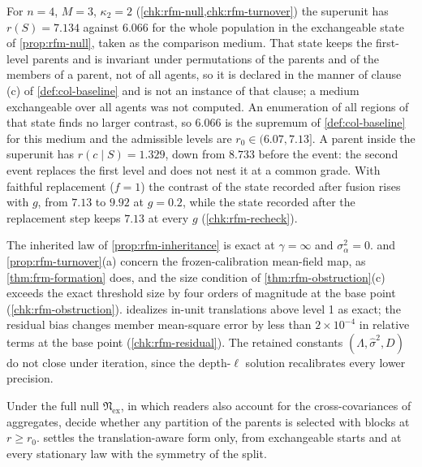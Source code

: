 \begin{observation}\label{obs:rfm-window}
For $n=4$, $M=3$, $\kappa_2=2$ (\cref{chk:rfm-null,chk:rfm-turnover}) the superunit has $r(S)=7.134$ against $6.066$ for the whole population in the exchangeable state of \cref{prop:rfm-null}, taken as the comparison medium. That state keeps the first-level parents and is invariant under permutations of the parents and of the members of a parent, not of all agents, so it is declared in the manner of clause (c) of \cref{def:col-baseline} and is not an instance of that clause; a medium exchangeable over all agents was not computed. An enumeration of all regions of that state finds no larger contrast, so $6.066$ is the supremum of \cref{def:col-baseline} for this medium and the admissible levels are $r_0\in(6.07,7.13]$. A parent inside the superunit has $r(c\mid S)=1.329$, down from $8.733$ before the event: the second event replaces the first level and does not nest it at a common grade. With faithful replacement ($f=1$) the contrast of the state recorded after fusion rises with $g$, from $7.13$ to $9.92$ at $g=0.2$, while the state recorded after the replacement step keeps $7.13$ at every $g$ (\cref{chk:rfm-recheck}).
\end{observation}

\begin{remark}[Scope]\label{rem:rfm-status}
The inherited law of \cref{prop:rfm-inheritance} is exact at $\gamma=\infty$ and $\sigma_\alpha^2=0$.  and \cref{prop:rfm-turnover}(a) concern the frozen-calibration mean-field map, as \cref{thm:frm-formation} does, and the size condition of \cref{thm:rfm-obstruction}(c) exceeds the exact threshold size by four orders of magnitude at the base point (\cref{chk:rfm-obstruction}).  idealizes in-unit translations above level 1 as exact; the residual bias changes member mean-square error by less than $2\times10^{-4}$ in relative terms at the base point (\cref{chk:rfm-residual}). The retained constants $(\Lambda,\hat\sigma^2,D)$ do not close under iteration, since the depth-$\ell$ solution recalibrates every lower precision.
\end{remark}

\begin{openproblem}\label{open:rfm-exact-fusion}
Under the full null $\mathfrak N_{\mathrm{ex}}$, in which readers also account for the cross-covariances of aggregates, decide whether any partition of the parents is selected with blocks at $r\ge r_0$.  settles the translation-aware form only, from exchangeable starts and at every stationary law with the symmetry of the split.
\end{openproblem}

